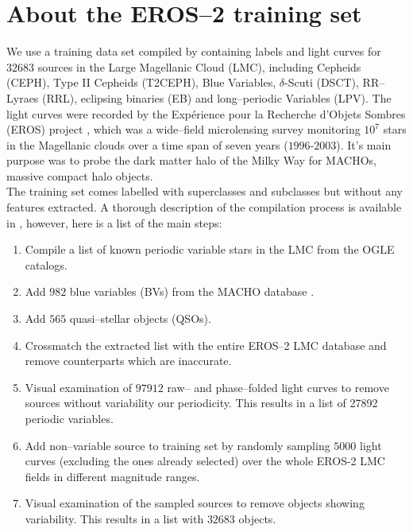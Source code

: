 \section{About the EROS--2 training set}
\label{sec:about-training-set}

We use a training data set compiled by \citet{kim2014} containing labels and light curves for $32683$ sources in the Large Magellanic Cloud (LMC), including Cepheids (CEPH), Type II Cepheids (T2CEPH), Blue Variables, $\delta$-Scuti (DSCT), RR--Lyraes (RRL), eclipsing binaries (EB) and long--periodic Variables (LPV). The light curves were recorded by the Expérience pour la Recherche d’Objets Sombres (EROS) project \citep{tisserand2007}, which was a wide--field microlensing survey monitoring $10^7$ stars in the Magellanic clouds over a time span of seven years ($1996$-$2003$). It's main purpose was to probe the dark matter halo of the Milky Way for MACHOs, massive compact halo objects.\\


The training set comes labelled with superclasses and subclasses but without any features extracted. A thorough description of the compilation process is available in \citet{kim2014}, however, here is a list of the main steps:

\begin{enumerate}
\item Compile a list of known periodic variable stars in the LMC from the OGLE \citep{udalski2008, soszy2008} catalogs.
\item Add $982$ blue variables (BVs) from the MACHO database \citep{keller2002}.
\item Add $565$ quasi--stellar objects (QSOs).
\item Crossmatch the extracted list with the entire EROS--2 LMC database and remove counterparts which are inaccurate.
\item Visual examination of $97912$ raw-- and phase--folded light curves to remove sources without variability our periodicity. This results in a list of 27892 periodic variables.
\item Add non--variable source to training set by randomly sampling $5000$ light curves (excluding the ones already selected) over the whole EROS-2 LMC fields in different magnitude ranges.
\item Visual examination of the sampled sources to remove objects showing variability. This results in a list with $32683$ objects.
\end{enumerate}

